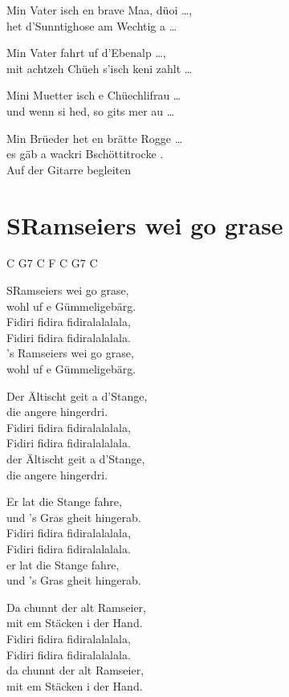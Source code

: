 \documentclass[
  letterpaper,
  twoside=false]{scrbook}
\begin{document}
Min Vater isch en brave Maa, düoi \ldots,\\
het d'Sunntighose am Wechtig a \ldots{}

Min Vater fahrt uf d'Ebenalp \ldots,\\
mit achtzeh Chüeh s'isch keni zahlt \ldots{}

Mini Muetter isch e Chüechlifrau \ldots{}\\
und wenn si hed, so git\textquotesingle s mer au \ldots{}

Min Brüeder het en brätte Rogge \ldots{}\\
es gäb a wackri Bschöttitrocke .\\
Auf der Gitarre begleiten

\hypertarget{sramseiers-wei-go-grase}{%
\chapter{S\textquotesingle Ramseiers wei go
grase}\label{sramseiers-wei-go-grase}}

C G7 C F C G7 C

S\textquotesingle Ramseiers wei go grase,\\
wohl uf e Gümmeligebärg.\\
Fidiri fidira fidiralalalala,\\
Fidiri fidira fidiralalalala.\\
's Ramseiers wei go grase,\\
wohl uf e Gümmeligebärg.

Der Ältischt geit a d'Stange,\\
die angere hingerdri.\\
Fidiri fidira fidiralalalala,\\
Fidiri fidira fidiralalalala.\\
der Ältischt geit a d'Stange,\\
die angere hingerdri.

Er lat die Stange fahre,\\
und 's Gras gheit hingerab.\\
Fidiri fidira fidiralalalala,\\
Fidiri fidira fidiralalalala.\\
er lat die Stange fahre,\\
und 's Gras gheit hingerab.

Da chunnt der alt Ramseier,\\
mit em Stäcken i der Hand.\\
Fidiri fidira fidiralalalala,\\
Fidiri fidira fidiralalalala.\\
da chunnt der alt Ramseier,\\
mit em Stäcken i der Hand.
\end{document}
